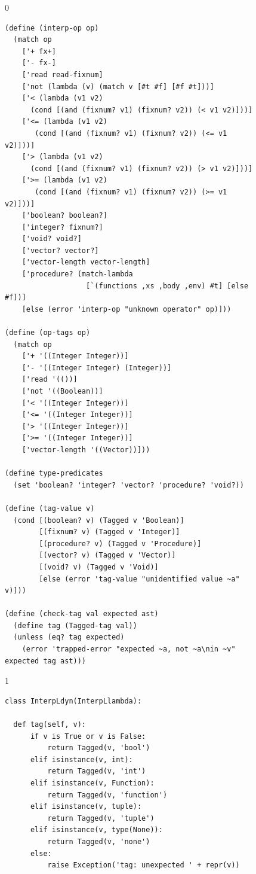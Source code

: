 \documentclass[7x10]{TimesAPriori_MIT}%
\def\racketEd{0}
\def\pythonEd{1}
\def\edition{1}
\newcommand{\pythonColor}[0]{}
\numberwithin{theorem}{chapter}
\numberwithin{definition}{chapter}
\numberwithin{equation}{chapter}
\begin{document}
\begin{figure}[tbp]
  \begin{tcolorbox}[colback=white]
    {\if\edition\racketEd
\begin{lstlisting}[basicstyle=\ttfamily\footnotesize]
(define (interp-op op)
  (match op
    ['+ fx+]
    ['- fx-]
    ['read read-fixnum]
    ['not (lambda (v) (match v [#t #f] [#f #t]))]
    ['< (lambda (v1 v2)
	  (cond [(and (fixnum? v1) (fixnum? v2)) (< v1 v2)]))]
    ['<= (lambda (v1 v2)
	   (cond [(and (fixnum? v1) (fixnum? v2)) (<= v1 v2)]))]
    ['> (lambda (v1 v2)
	  (cond [(and (fixnum? v1) (fixnum? v2)) (> v1 v2)]))]
    ['>= (lambda (v1 v2)
	   (cond [(and (fixnum? v1) (fixnum? v2)) (>= v1 v2)]))]
    ['boolean? boolean?]
    ['integer? fixnum?]
    ['void? void?]
    ['vector? vector?]
    ['vector-length vector-length]
    ['procedure? (match-lambda
                   [`(functions ,xs ,body ,env) #t] [else #f])]
    [else (error 'interp-op "unknown operator" op)]))

(define (op-tags op)
  (match op
    ['+ '((Integer Integer))]
    ['- '((Integer Integer) (Integer))]
    ['read '(())]
    ['not '((Boolean))]
    ['< '((Integer Integer))]
    ['<= '((Integer Integer))]
    ['> '((Integer Integer))]
    ['>= '((Integer Integer))]
    ['vector-length '((Vector))]))

(define type-predicates
  (set 'boolean? 'integer? 'vector? 'procedure? 'void?))

(define (tag-value v)
  (cond [(boolean? v) (Tagged v 'Boolean)]
        [(fixnum? v) (Tagged v 'Integer)]
        [(procedure? v) (Tagged v 'Procedure)]
        [(vector? v) (Tagged v 'Vector)]
        [(void? v) (Tagged v 'Void)]
        [else (error 'tag-value "unidentified value ~a" v)]))

(define (check-tag val expected ast)
  (define tag (Tagged-tag val))
  (unless (eq? tag expected)
    (error 'trapped-error "expected ~a, not ~a\nin ~v" expected tag ast)))
\end{lstlisting}
\fi}
{\if\edition\pythonEd\pythonColor
\begin{lstlisting}[basicstyle=\ttfamily\footnotesize]
class InterpLdyn(InterpLlambda):
  
  def tag(self, v):
      if v is True or v is False:
          return Tagged(v, 'bool')
      elif isinstance(v, int):
          return Tagged(v, 'int')
      elif isinstance(v, Function):
          return Tagged(v, 'function')
      elif isinstance(v, tuple):
          return Tagged(v, 'tuple')
      elif isinstance(v, type(None)):
          return Tagged(v, 'none')
      else:
          raise Exception('tag: unexpected ' + repr(v))


\end{lstlisting}}
\end{tcolorbox}
\end{figure}
\end{document}
